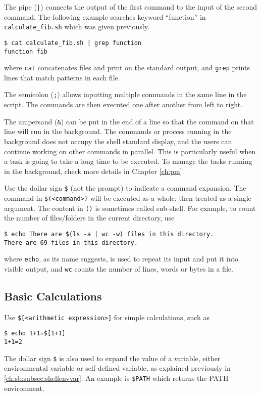 The pipe (\verb$|$) connects the output of the first command to the input of the second command. The following example searches keyword ``function'' in \verb|calculate_fib.sh| which was given previously.
\begin{lstlisting}
$ cat calculate_fib.sh | grep function
function fib
\end{lstlisting}
where \verb|cat| concatenates files and print on the standard output, and \verb|grep| prints lines that match patterns in each file.

The semicolon (\verb|;|) allows inputting multiple commands in the same line in the script. The commands are then executed one after another from left to right.

The ampersand (\verb|&|) can be put in the end of a line so that the command on that line will run in the background. The commands or process running in the background does not occupy the shell standard display, and the users can continue working on other commands in parallel. This is particularly useful when a task is going to take a long time to be executed. To manage the tasks running in the background, check more details in Chapter \ref{ch:pm}.

Use the dollar sign \verb|$| (not the prompt) to indicate a command expansion. The command in \verb|$(<command>)| will be executed as a whole, then treated as a single argument. The content in \verb|()| is sometimes called sub-shell. For example, to count the number of files/folders in the current directory, use
\begin{lstlisting}
$ echo There are $(ls -a | wc -w) files in this directory.
There are 69 files in this directory.
\end{lstlisting}
where \verb|echo|, as its name suggests, is used to repeat its input and put it into visible output, and \verb|wc| counts the number of lines, words or bytes in a file.

\subsection{Basic Calculations}

Use \verb|$[<arithmetic expression>]| for simple calculations, such as
\begin{lstlisting}
$ echo 1+1=$[1+1]
1+1=2
\end{lstlisting}

The dollar sign \verb|$| is also used to expand the value of a variable, either environmental variable or self-defined variable, as explained previously in \ref{ch:sb:subsec:shellenvvar}. An example is \verb|$PATH| which returns the PATH environment.

